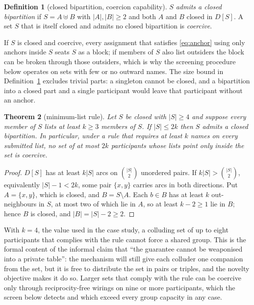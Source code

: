 \documentclass[11pt,a4paper]{article}
\theoremstyle{plain}
\newtheorem{theorem}{Theorem}[section]
\theoremstyle{definition}
\newtheorem{definition}[theorem]{Definition}
\theoremstyle{remark}
\begin{document}
\begin{definition}[closed bipartition, coercion capability]\label{def:coercive}
$S$ \emph{admits a closed bipartition} if $S = A \uplus B$ with $|A|, |B| \ge 2$ and both $A$ and $B$ closed in $D[S]$. A set $S$ that is itself closed and admits no closed bipartition is \emph{coercive}.
\end{definition}
If $S$ is closed and coercive, every assignment that satisfies \eqref{eq:anchor} using only anchors inside $S$ seats $S$ as a block; if members of $S$ also list outsiders the block can be broken through those outsiders, which is why the screening procedure below operates on sets with few or no outward names. The size bound in Definition~\ref{def:coercive} excludes trivial parts: a singleton cannot be closed, and a bipartition into a closed part and a single participant would leave that participant without an anchor.

\begin{theorem}[minimum-list rule]\label{thm:mink}
Let $S$ be closed with $|S| \ge 4$ and suppose every member of $S$ lists at least $k \ge 3$ members of $S$. If $|S| \le 2k$ then $S$ admits a closed bipartition. In particular, under a rule that requires at least $k$ names on every submitted list, no set of at most $2k$ participants whose lists point only inside the set is coercive.
\end{theorem}
\begin{proof}
$D[S]$ has at least $k|S|$ arcs on $\binom{|S|}{2}$ unordered pairs. If $k|S| > \binom{|S|}{2}$, equivalently $|S| - 1 < 2k$, some pair $\{x, y\}$ carries arcs in both directions. Put $A = \{x,y\}$, which is closed, and $B = S \setminus A$. Each $b \in B$ has at least $k$ out-neighbours in $S$, at most two of which lie in $A$, so at least $k - 2 \ge 1$ lie in $B$; hence $B$ is closed, and $|B| = |S| - 2 \ge 2$.
\end{proof}

With $k = 4$, the value used in the case study, a colluding set of up to eight participants that complies with the rule cannot force a shared group. This is the formal content of the informal claim that ``the guarantee cannot be weaponised into a private table'': the mechanism will still give each colluder one companion from the set, but it is free to distribute the set in pairs or triples, and the novelty objective makes it do so. Larger sets that comply with the rule can be coercive only through reciprocity-free wirings on nine or more participants, which the screen below detects and which exceed every group capacity in any case.
\end{document}
